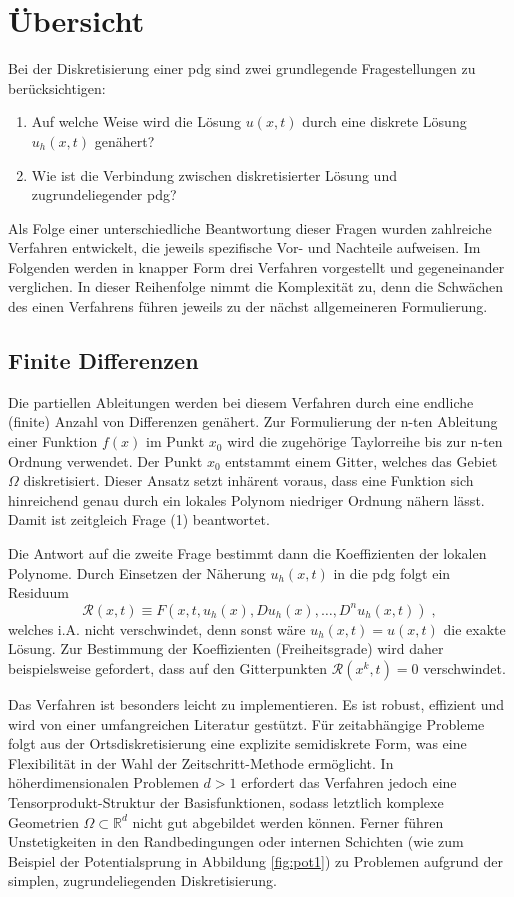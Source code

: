 \section{Übersicht}\label{sec:Übersicht}
Bei der Diskretisierung einer \ac{pdg} sind zwei grundlegende Fragestellungen zu berücksichtigen:
\begin{enumerate}
  \item Auf welche Weise wird die Lösung $u(x,t)$ durch eine diskrete Lösung $u_h(x,t)$ genähert?
  \item Wie ist die Verbindung zwischen diskretisierter Lösung und zugrundeliegender \ac{pdg}?
\end{enumerate}
Als Folge einer unterschiedliche Beantwortung dieser Fragen wurden zahlreiche Verfahren entwickelt, die jeweils spezifische Vor- und Nachteile aufweisen. Im Folgenden werden in knapper Form drei Verfahren vorgestellt und  gegeneinander verglichen. In dieser Reihenfolge nimmt die Komplexität zu, denn die Schwächen des einen Verfahrens führen jeweils zu der nächst allgemeineren Formulierung.

\subsection{Finite Differenzen}\label{sec:FD}
Die partiellen Ableitungen werden bei diesem Verfahren durch eine endliche (finite) Anzahl von Differenzen genähert. Zur Formulierung der n-ten Ableitung einer Funktion $f(x)$ im Punkt $x_0$ wird die zugehörige Taylorreihe bis zur n-ten Ordnung verwendet. Der Punkt $x_0$ entstammt einem Gitter, welches das Gebiet $\Omega$ diskretisiert. Dieser Ansatz setzt inhärent voraus, dass eine Funktion sich hinreichend genau durch ein lokales Polynom niedriger Ordnung nähern lässt. Damit ist zeitgleich Frage (1) beantwortet.

Die Antwort auf die zweite Frage bestimmt dann die Koeffizienten der lokalen Polynome. Durch Einsetzen der Näherung $u_h(x,t)$ in die \ac{pdg} folgt ein Residuum
\begin{equation}
  \mathcal{R}(x,t)\equiv F(x,t, u_h(x), Du_h(x), \dots, D^nu_h(x,t)) \; ,
\end{equation}
welches i.A. nicht verschwindet, denn sonst wäre ${u_h(x,t) = u(x,t)}$ die exakte Lösung. Zur Bestimmung der Koeffizienten (Freiheitsgrade) wird daher beispielsweise gefordert, dass auf den Gitterpunkten ${\mathcal{R}(x^k,t)=0}$ verschwindet.

Das Verfahren ist besonders leicht zu implementieren. Es ist robust, effizient und wird von einer umfangreichen Literatur gestützt. Für zeitabhängige Probleme folgt aus der Ortsdiskretisierung eine explizite semidiskrete Form, was eine Flexibilität in der Wahl der Zeitschritt-Methode ermöglicht. In höherdimensionalen Problemen $d>1$ erfordert das Verfahren jedoch eine Tensorprodukt-Struktur der Basisfunktionen, sodass letztlich komplexe Geometrien $\Omega\subset{\mathbb{R}^d}$ nicht gut abgebildet werden können. Ferner führen Unstetigkeiten in den Randbedingungen oder internen Schichten (wie zum Beispiel der Potentialsprung in Abbildung \ref{fig:pot1}) zu Problemen aufgrund der simplen, zugrundeliegenden Diskretisierung.

